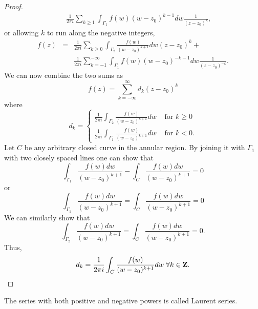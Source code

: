 \begin{proof}
\begin{eqnarray*}
 & & \frac{1}{2\pi i}
\sum_{k \ge 1}\int_{\Gamma_1}f(w)(w - z_0)^{k-1}dw \frac{1}{(z - z_0)^{k}},
\end{eqnarray*}
or allowing $k$ to run along the negative integers,
\begin{eqnarray*}
f(z) &=& \frac{1}{2\pi i}
\sum_{k \ge 0}\int_{\Gamma_2}\frac{f(w)}{(w - z_0)^{k+1}}dw (z-z_0)^k + \\
 & & \frac{1}{2\pi i}
 \sum_{k=-1}^{-\infty}\int_{\Gamma_1}f(w)(w - z_0)^{-k-1}dw 
\frac{1}{(z - z_0)^{-k}}.
\end{eqnarray*}
We can now combine the two sums as
\[
f(z) = \sum_{k=-\infty}^\infty d_k (z - z_0)^k
\]
where
\[
d_k = \begin{cases}
\frac{1}{2\pi i}
\int_{\Gamma_2}\frac{f(w)}{(w - z_0)^{k+1}}dw & \text{ for } k \ge 0 \\
\frac{1}{2\pi i}
\int_{\Gamma_1}\frac{f(w)}{(w - z_0)^{k+1}}dw & \text{ for } k < 0 .
\end{cases}
\]
Let $C$ be any arbitrary closed curve in the annular region. By joining it
with $\Gamma_1$ with two closely spaced lines one can show that
\[
\int_{\Gamma_1}\frac{f(w)dw}{(w - z_0)^{k+1}} - 
\int_C\frac{f(w)dw}{(w - z_0)^{k+1}} = 0
\]
or 
\[
\int_{\Gamma_1}\frac{f(w)dw}{(w - z_0)^{k+1}} = 
\int_C\frac{f(w)dw}{(w - z_0)^{k+1}} = 0
\]
We can similarly show that
\[
\int_{\Gamma_2}\frac{f(w)dw}{(w - z_0)^{k+1}} = 
\int_C\frac{f(w)dw}{(w - z_0)^{k+1}} = 0.
\]
Thus,
\[
d_k = \frac{1}{2\pi i}\int_C \frac{f(w)}{(w - z_0)^{k + 1}}dw \;\forall k \in
\mathbf{Z}.
\]
\end{proof}
\begin{rem}
The series with both positive and negative powers is called Laurent series.
\end{rem}
